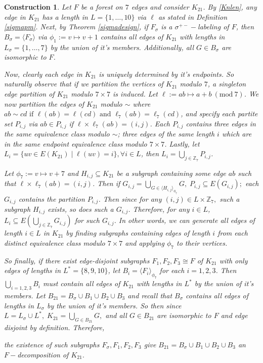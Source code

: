 \documentclass[addpoints,11pt]{exam}
\newtheorem{const}[theorem]{Construction}
\theoremstyle{definition}
\newcommand{\Mod}[1]{\ (\mathrm{mod}\ #1)}
\newcommand{\ZZ}{\ensuremath{\mathbb{Z}}}
\begin{document}
\begin{const}\label{K21design}
  Let $F$ be a forest on $7$ edges and consider $K_{21}$. By \ref{Knlen}, any edge in $K_{21}$ has a length in $L=\{1,\hdots,10\}$ via $\ell$ as stated in  Definition \ref{sigmapm}. Next, by Theorem \ref{sigmadesign}, if $F_{\sigma}$ is a $\sigma^{+-}-$labeling of $F$, then $B_{\sigma}=\langle F_{\sigma}\rangle$ via $\phi_{1}:=v\mapsto v+1$ contains all edges of $K_{21}$ with lengths in $L_{\sigma}=\{1,\hdots,7\}$ by the union of it's members. Additionally, all $G\in B_{\sigma}$ are isomorphic to $F$.

  Now, clearly each edge in $K_{21}$ is uniquely determined by it's endpoints. So naturally observe that if we partition the vertices of $K_{21}$ modulo $7$, a singleton edge partition of $K_{21}$ modulo $7\times 7$ is induced. Let $\ell:=ab\mapsto a+b\Mod{7}$. We now partition the edges of $K_{21}$ modulo $\sim$ where $ab\sim cd\text{ if } \ell(ab)=\ell(cd)\text{ and }\ell_{7}(ab)=\ell_{7}(cd)$, and specify each partite set $P_{i,j}$ via $ab\in P_{i,j}$ if $\ell\times \ell_{7}(ab)=(i,j)$. Each $P_{i,j}$ contains three edges in the same equivalence class modulo $\sim$; three edges of the same length $i$ which are in the same endpoint equivalence class modulo $7\times 7$. Lastly, let $L_{i}=\{uv\in E(K_{21})\mid \ell(uv)=i\},\forall i\in L$, then  $L_{i}=\bigcup_{j\in \mathbb{Z}_{7}}P_{i,j}$.

  Let $\phi_{7}:=v\mapsto v+7$ and $H_{i,j}\subseteq K_{21}$ be a subgraph containing some edge $ab$ such that $\ell\times \ell_{7}(ab)=(i,j)$. Then if $G_{i,j}=\bigcup_{G\in \langle H_{i,j}\rangle_{\phi_{7}}}G,\;P_{i,j}\subseteq E(G_{i,j});$ each $G_{i,j}$ contains the partition $P_{i,j}$. Then since for any $(i,j)\in L\times \ZZ_{7},$ such a subgraph $H_{i,j}$ exists, so does such a $G_{i,j}$. Therefore, for any $i\in L$, $L_{i}\subseteq E(\bigcup_{j\in \ZZ_{7}}G_{i,j})$ for such $G_{i,j}$. In other words, we can generate all edges of length $i\in L$ in $K_{21}$ by finding subgraphs containing edges of length $i$ from each distinct equivalence class modulo $7\times 7$ and applying $\phi_{7}$ to their vertices.

  So finally, if there exist edge-disjoint subgraphs $F_{1},F_{2},F_{3}\cong F$ of $K_{21}$ with only edges of lengths in $L^{*}=\{8,9,10\}$, let $B_{i}=\langle F_{i}\rangle_{\phi_{7}}$ for each $i=1,2,3$. Then $\bigcup_{i=1,2,3}B_{i}$ must contain all edges of $K_{21}$ with lengths in $L^{*}$ by the union of it's members. Let $B_{21}=B_{\sigma}\cup B_{1}\cup B_{2}\cup B_{3}$ and recall that $B_{\sigma}$ contains all edges of lengths in $L_{\sigma}$ by the union of it's members. So then since $L=L_{\sigma}\cup L^{*},\;K_{21}=\bigcup_{G\in B_{21}}G,$ and all $G\in B_{21}$ are isomorphic to $F$ and edge disjoint by definition. Therefore,
  \begin{center}
  the existence of such subgraphs $F_{\sigma},F_{1},F_{2},F_{3}$ give $B_{21}=B_{\sigma}\cup B_{1}\cup B_{2}\cup B_{3}$ an $F-$decomposition of $K_{21}.$
  \end{center}

\end{const}
\end{document}

